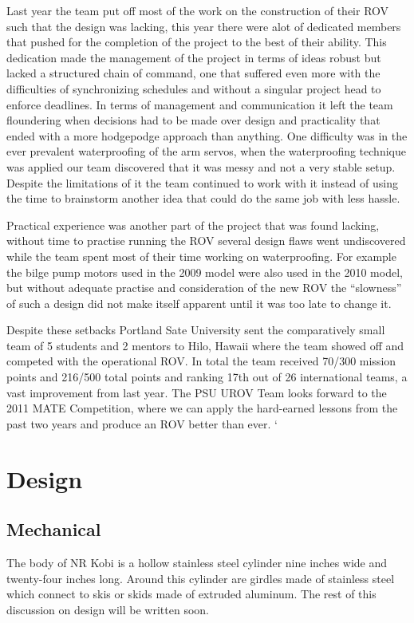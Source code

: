 \documentclass{proposalnsf}
\begin{document}
Last year the team put off most of the work on the construction of their ROV such that the design was lacking, this year there were alot of dedicated members that pushed for the completion
of the project to the best of their ability.  This dedication made the management of the project in terms of ideas robust but lacked a structured chain of command, one that suffered even more with the difficulties
of synchronizing schedules and without a singular project head to enforce deadlines.  In terms of management and communication it left the team floundering when decisions had to be made over design and practicality 
that ended with a more hodgepodge approach than anything.  
One difficulty was in the ever prevalent waterproofing of the arm servos, when the waterproofing technique was applied our team discovered that it 
was messy and not a very stable setup.  Despite the limitations of it the team continued to work with it instead of using the time to brainstorm another idea that could do the same job with less hassle.

Practical experience was another part of the project that was found lacking, without time to practise running the ROV several design flaws went undiscovered while the team spent most of their time
working on waterproofing.  For example the bilge pump motors used in the 2009 model were also used in the 2010 model, but without adequate practise and consideration of the new ROV
the ``slowness'' of such a design did not make itself apparent until it was too late to change it.  

Despite these setbacks Portland Sate University sent the comparatively small team of 5 students and 2 mentors to Hilo, Hawaii where the team showed off and competed with the operational ROV.  In total the team received 70/300 
mission points and 216/500 total points and ranking 17th out of 26 international teams, a vast improvement from last year.  The PSU UROV Team looks forward to the 2011 MATE Competition, where we can apply the hard-earned
lessons from the past two years and produce an ROV better than ever.
`

\renewcommand{\thepage} {D--\arabic{page}}

\section{Design}
\subsection{Mechanical}
The body of NR Kobi is a hollow stainless steel cylinder nine inches wide and twenty-four inches long. Around this cylinder are girdles made of stainless steel which connect to skis or skids made of extruded aluminum. The rest of this discussion on design will be written soon. 
\end{document}
